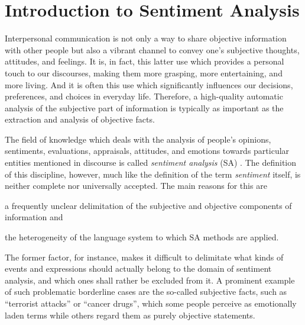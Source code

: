 


\chapter{Introduction to Sentiment Analysis}

Interpersonal communication is not only a way to share objective
information with other people but also a vibrant channel to convey
one's subjective thoughts, attitudes, and feelings.  It is, in fact,
this latter use which provides a personal touch to our discourses,
making them more grasping, more entertaining, and more living.  And it
is often this use which significantly influences our decisions,
preferences, and choices in everyday life.  Therefore, a high-quality
automatic analysis of the subjective part of information is typically
as important as the extraction and analysis of objective facts.

The field of knowledge which deals with the analysis of people's
opinions, sentiments, evaluations, appraisals, attitudes, and emotions
towards particular entities mentioned in discourse is called
\emph{sentiment analysis} (SA) \citep{Liu:12}.  The definition of this
discipline, however, much like the definition of the term
\emph{sentiment} itself, is neither complete nor universally accepted.
The main reasons for this are
\begin{inparaenum}
  \item a frequently unclear delimitation of the subjective and
    objective components of information and
  \item the heterogeneity of the language system to which SA methods
    are applied.
\end{inparaenum}

The former factor, for instance, makes it difficult to delimitate what
kinds of events and expressions should actually belong to the domain
of sentiment analysis, and which ones shall rather be excluded from
it.  A prominent example of such problematic borderline cases are the
so-called subjective facts, such as ``terrorist attacks'' or ``cancer
drugs'', which some people perceive as emotionally laden terms while
others regard them as purely objective statements.

